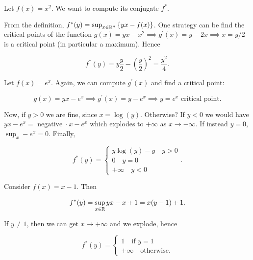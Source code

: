 \begin{example}
    
    Let $f(x) = x^2$. We want to compute its conjugate $f^*$. 

    From the definition, $f^*(y) = \sup_{x \in {\mathbb{R}^n}} \left\{ yx - f(x) \right\}$. One strategy can be find the critical points of the function $g(x) = yx - x^2 \implies g^\prime(x)=y - 2x \implies x = y/2$ is a critical point (in particular a maximum). Hence 
    
    \[ f^*(y) = y \frac{y}{2} - (\frac{y}{2})^2 = \frac{y^2}{4}. \]

\end{example}

\begin{example}
    
    Let $f(x) = e^x$. Again, we can compute $g^\prime(x)$ and find a critical point:

    \[ g(x) = yx - e^x \implies g^\prime(x) = y-e^x \implies y = e^x \text{ critical point}. \]

    Now, if $y > 0$ we are fine, since $x = \log(y)$. Otherwise? If $y < 0$ we would have $yx - e^x = \text{ negative }\cdot x - e^x$ which explodes to $+\infty$ as $x \to -\infty$. If instead $y=0$, $\sup_x -e^x = 0$. Finally, 

    \[ 
        f^*(y) = 
        \begin{cases}
            y\log(y) - y \quad y > 0 \\
            0 \quad y = 0 \\
            +\infty \quad y < 0
        \end{cases}.
    \]  

\end{example}

\begin{example}
    
    Consider $f(x) = x - 1$. Then

    \[ f^*(y) = \sup_{x \in \mathbb{R}} yx - x + 1 = x(y-1) + 1. \]

    If $y \neq 1$, then we can get $x \to +\infty$ and we explode, hence 

    \[ f^*(y) = \begin{cases}
        1 \quad \text{if } y = 1 \\
        +\infty \quad \text{otherwise}.
    \end{cases} \]

\end{example}

